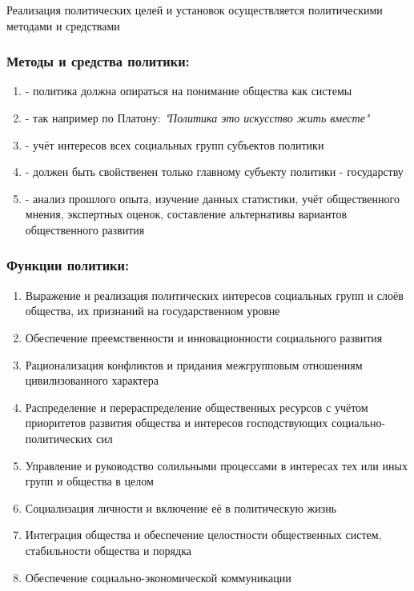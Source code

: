 Реализация политических целей и установок осуществляется политическими методами и
средствами

\subsubsection{Методы и средства политики:}

\begin{enumerate}
      \item {} - политика должна
            опираться на понимание общества как системы
      \item {} - так например по
            Платону: \textit{"Политика это искусство жить вместе"}
      \item {} - учёт интересов всех социальных групп
            субъектов политики
      \item {} - должен быть свойственен только главному
            субъекту политики - государству
      \item {} - анализ прошлого опыта,
            изучение данных статистики, учёт общественного мнения, экспертных оценок,
            составление альтернативы вариантов общественного развития
\end{enumerate}

\subsubsection{Функции политики:}

\begin{enumerate}
      \item Выражение и реализация политических интересов социальных групп и слоёв
            общества, их признаний на государственном уровне
      \item Обеспечение преемственности и инновационности социального развития
      \item Рационализация конфликтов и придания межгрупповым отношениям цивилизованного
            характера
      \item Распределение и перераспределение общественных ресурсов с учётом приоритетов
            развития общества и интересов господствующих социально-политических сил
      \item Управление и руководство солильными процессами в интересах тех или иных
            групп и общества в целом
      \item Социализация личности и включение её в политическую жизнь
      \item Интеграция общества и обеспечение целостности общественных систем,
            стабильности общества и порядка
      \item Обеспечение социально-экономической коммуникации
\end{enumerate}

